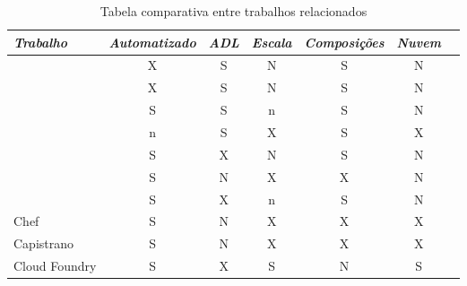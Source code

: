 \begin{table}[!t]
\begin{center}
    \begin{tabular}{l c c c c c c}
	 \hline
	 \itshape{Trabalho} & \itshape{Automatizado} & \itshape{ADL} & \itshape{Escala} & \itshape{Composições} & \itshape{Nuvem}  \\ \hline
    \cite{Magee1994Regis, Magee1996Dynamic} & X & S & N & S & N \\
    \cite{Balter1998Olan}   & X & S & N & S & N \\
    \cite{quema2004hierarchical}  & S & S & n & S & N \\
    \cite{akkerman2005j2ee}   & n & S & X & S & X \\
    \cite{Lacour2004Corba} & S & X & N & S & N \\
    \cite{Dolstra2005Configuration}   & S & N & X & X & N \\
    \cite{Watson2006Dynasoar}   & S & X & n & S & N \\
    Chef   & S & N & X & X & X \\
    Capistrano   & S & N & X & X & X \\
    Cloud Foundry   & S & X & S & N & S \\

    \end{tabular}
  \caption{Tabela comparativa entre trabalhos relacionados}
  \label{tab:relacionados}
\end{center}
\end{table}




